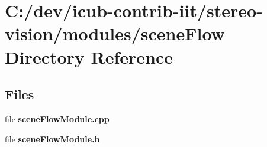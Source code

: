 \section{C\+:/dev/icub-\/contrib-\/iit/stereo-\/vision/modules/scene\+Flow Directory Reference}
\label{dir_abac25be6e9586a73e0319a6df944064}
\subsection*{Files}
\begin{DoxyCompactItemize}
\item 
file {\bfseries scene\+Flow\+Module.\+cpp}
\item 
file {\bfseries scene\+Flow\+Module.\+h}
\end{DoxyCompactItemize}
